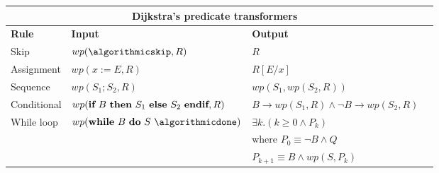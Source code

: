 \documentclass[11pt]{article}
\begin{document}
\begin{tabular}{llll}
\multicolumn{3}{c}{\textbf{Dijkstra's predicate transformers}}\\
\toprule
\textbf{Rule} & \textbf{Input} & \textbf{Output}\\
\midrule
Skip &       $wp(\algorithmicskip, R)$  & $R$\\[2mm]
Assignment  & $wp(x := E, R)$ & $R[E/x]$\\[2mm]
Sequence    & $wp(S_1; S_2, R)$ & $wp(S_1, wp(S_2, R))$\\[2mm]
Conditional & $wp(\algorithmicif~B~\algorithmicthen~S_1 ~\algorithmicelse~ S_2 ~\algorithmicend\algorithmicif, R)$ & $B \rightarrow wp(S_1, R) \land \neg B \rightarrow wp(S_2, R)$\\[2mm]
While loop  & $wp(\algorithmicwhile~ B ~\algorithmicdo~ S ~\algorithmicdone)$
            & $\exists k . (k \geq 0 \land P_k)$\\
          & & where $P_0 \equiv \neg B \land Q$\\
          & & \quad\quad $P_{k+1} \equiv B \land wp(S, P_k)$\\
\bottomrule
\end{tabular}
\end{document}
